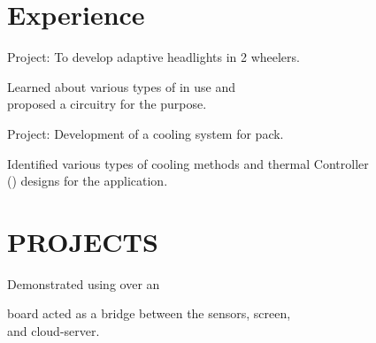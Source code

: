 \documentclass[]{deedy-resume-openfont}
\begin{document}
\begin{minipage}[t]{0.69\textwidth} 


\section{Experience}
\vspace{\topsep}
\begin{tightemize}
\item Project: To develop adaptive headlights in 2 wheelers. 
\item Learned about various types of  in use and \\proposed a circuitry for the purpose.  
\end{tightemize}
\sectionsep

\begin{tightemize}
\item Project: Development of a cooling system for  pack.
\item Identified various types of cooling methods and thermal Controller \\() designs for the application.
\end{tightemize}
\sectionsep


\section{PROJECTS}
\begin{tightemize}
\item Demonstrated  using  over an \\
\item {} board acted as a bridge between the sensors, screen,\\ and cloud-server.
\end{tightemize}
\sectionsep



\end{minipage}
\end{document}
